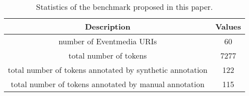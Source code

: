 \documentclass[10pt,a4paper]{article}
\begin{document}
{%
\begin{table}[h]
\centering %
\begin{tabular}{c c } %
\hline %
Description & Values \\ [0.5ex] %
\hline\hline %
number of Eventmedia URIs & 60  \\
total number of tokens & 7277  \\
total number of tokens annotated by synthetic annotation & 122  \\
total number of tokens annotated by manual annotation & 115  \\
\hline %
\end{tabular}
\caption{Statistics of the benchmark proposed in this paper.} %
\label{tab:benchmark} %
\end{table}

}
\end{document}
